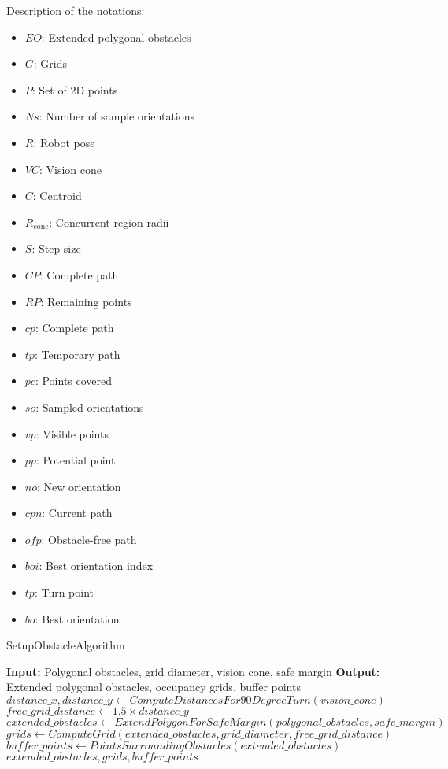     Description of the notations:
    \begin{itemize}[noitemsep,topsep=0pt]
        \item $EO$: Extended polygonal obstacles
        \item $G$: Grids
        \item $P$: Set of 2D points
        \item $Ns$: Number of sample orientations
        \item $R$: Robot pose
        \item $VC$: Vision cone
        \item $C$: Centroid
        \item $R_{\text{conc}}$: Concurrent region radii
        \item $S$: Step size
        \item $CP$: Complete path
        \item $RP$: Remaining points
        \item $cp$: Complete path
        \item $tp$: Temporary path
        \item $pc$: Points covered
        \item $so$: Sampled orientations
        \item $vp$: Visible points
        \item $pp$: Potential point
        \item $no$: New orientation
        \item $cpn$: Current path
        \item $ofp$: Obstacle-free path
        \item $boi$: Best orientation index
        \item $tp$: Turn point
        \item $bo$: Best orientation
    \end{itemize}

    



\begin{algorithm}[H]
    \caption{SetupObstacleAlgorithm}
    \begin{algorithmic}[1]
        \Statex \textbf{Input:} Polygonal obstacles, grid diameter, vision cone, safe margin
        \Statex \textbf{Output:} Extended polygonal obstacles, occupancy grids, buffer points
        \newline
        \State $distance\_x, distance\_y \gets ComputeDistancesFor90DegreeTurn(vision\_cone)$
        \State $free\_grid\_distance \gets 1.5 \times distance\_y$
        \State $extended\_obstacles \gets ExtendPolygonForSafeMargin(polygonal\_obstacles, safe\_margin)$
        \State $grids \gets ComputeGrid(extended\_obstacles, grid\_diameter, free\_grid\_distance)$
        \State $buffer\_points \gets PointsSurroundingObstacles(extended\_obstacles)$
        \State \Return $extended\_obstacles, grids, buffer\_points$
    \end{algorithmic}
\end{algorithm}

